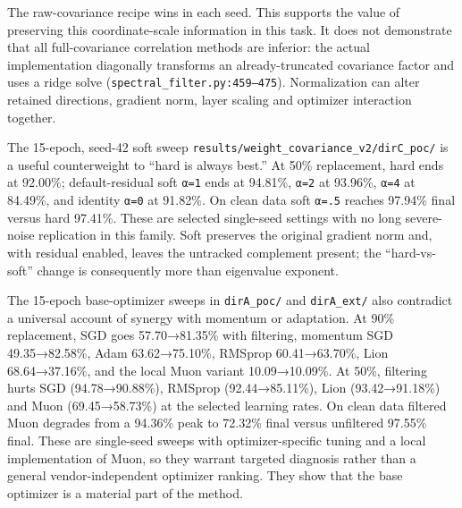 \documentclass[
  british,
  10pt,
  a4paper,
]{article}
\begin{document}
The raw-\allowbreak{}covariance recipe wins in each seed. This supports
the value of preserving this coordinate-\allowbreak{}scale information
in this task. It does not demonstrate that all
full-\allowbreak{}covariance correlation methods are inferior: the
actual implementation diagonally transforms an
already-\allowbreak{}truncated covariance factor and uses a ridge solve
(\texttt{spectral\_\allowbreak{}filter.\allowbreak{}py:\allowbreak{}459–475}).
Normalization can alter retained directions,\allowbreak{} gradient norm,
layer scaling and optimizer interaction together.

The 15-epoch, seed-42 soft sweep
\texttt{results/\allowbreak{}weight\_\allowbreak{}covariance\_\allowbreak{}v2/\allowbreak{}dirC\_\allowbreak{}poc/\allowbreak{}}
is a useful counterweight to ``hard is always best.'' At 50\%
replacement,\allowbreak{} hard ends at 92.00\%;
default-\allowbreak{}residual soft \texttt{α=1} ends at 94.81\%,
\texttt{α=2} at 93.96\%, \texttt{α=4} at 84.49\%, and identity
\texttt{α=0} at 91.82\%. On clean data soft \texttt{α=.5} reaches
97.94\% final versus hard 97.41\%. These are selected
single-\allowbreak{}seed settings with no long severe-\allowbreak{}noise
replication in this family. Soft preserves the original gradient norm
and, with residual enabled, leaves the untracked complement present; the
“hard-\allowbreak{}vs-\allowbreak{}soft” change is consequently more
than eigenvalue exponent.

The 15-epoch base-\allowbreak{}optimizer sweeps in \texttt{dirA\_poc/}
and \texttt{dirA\_ext/} also contradict a universal account of synergy
with momentum or adaptation.\allowbreak{} At 90\%
replacement,\allowbreak{} SGD goes
57.\allowbreak{}70→81.\allowbreak{}35\% with filtering, momentum SGD
49.\allowbreak{}35→82.\allowbreak{}58\%,\allowbreak{} Adam
63.\allowbreak{}62→75.\allowbreak{}10\%,\allowbreak{} RMSprop
60.\allowbreak{}41→63.\allowbreak{}70\%,\allowbreak{} Lion
68.\allowbreak{}64→37.\allowbreak{}16\%,\allowbreak{} and the local Muon
variant 10.\allowbreak{}09→10.\allowbreak{}09\%.\allowbreak{} At 50\%,
filtering hurts SGD
(94.\allowbreak{}78→90.\allowbreak{}88\%),\allowbreak{} RMSprop
(92.\allowbreak{}44→85.\allowbreak{}11\%),\allowbreak{} Lion
(93.\allowbreak{}42→91.\allowbreak{}18\%) and Muon
(69.\allowbreak{}45→58.\allowbreak{}73\%) at the selected learning
rates. On clean data filtered Muon degrades from a 94.36\% peak to
72.32\% final versus unfiltered 97.55\% final. These are
single-\allowbreak{}seed sweeps with optimizer-\allowbreak{}specific
tuning and a local implementation of Muon, so they warrant targeted
diagnosis rather than a general vendor-\allowbreak{}independent
optimizer ranking. They show that the base optimizer is a material part
of the method.
\end{document}
